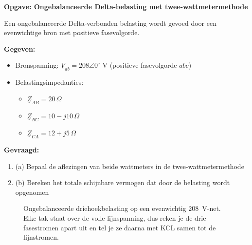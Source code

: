 \documentclass[a4paper,11pt]{article}
\begin{document}
\textbf{Opgave: Ongebalanceerde Delta-belasting met twee-wattmetermethode}

Een ongebalanceerde Delta-verbonden belasting wordt gevoed door een evenwichtige bron met positieve fasevolgorde.

\textbf{Gegeven:}
\begin{itemize}
    \item Bronspanning: $\underline{V}_{ab} = 208\angle{0^\circ} \text{ V}$ (positieve fasevolgorde $abc$)
    \item Belastingsimpedanties:
          \begin{itemize}
              \item $\underline{Z}_{AB} = 20 \, \Omega$
              \item $\underline{Z}_{BC} = 10 - j10 \, \Omega$
              \item $\underline{Z}_{CA} = 12 + j5 \, \Omega$
          \end{itemize}
\end{itemize}

\textbf{Gevraagd:}
\begin{enumerate}
    \item (a) Bepaal de aflezingen van beide wattmeters in de twee-wattmetermethode
    \item (b) Bereken het totale schijnbare vermogen dat door de belasting wordt opgenomen
\end{enumerate}

\begin{figure}[H]
    \centering
    \caption{Ongebalanceerde driehoekbelasting op een evenwichtig $208$~V-net. Elke tak staat over
        de volle lijnspanning, dus reken je de drie fasestromen apart uit en tel je ze daarna met KCL
        samen tot de lijnstromen.}
    \label{fig:onev-delta-208}
\end{figure}
\FloatBarrier
\end{document}
